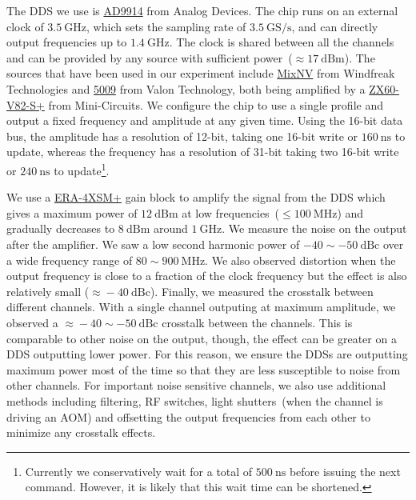 The DDS we use is \href{https://www.analog.com/en/products/ad9914.html}{AD9914}
from Analog Devices.
The chip runs on an external clock of $3.5~\mathrm{GHz}$,
which sets the sampling rate of $3.5~\mathrm{GS/s}$,
and can directly output frequencies up to $1.4~\mathrm{GHz}$.
The clock is shared between all the channels and can be provided by any source
with sufficient power~($\approx17~\mathrm{dBm}$).
The sources that have been used in our experiment include
\href{https://windfreaktech.com/product/rf-mixer-downconverter-upconverter/}{MixNV}
from Windfreak Technologies and
\href{https://www.valonrf.com/frequency-synthesizer-6ghz.html}{5009}
from Valon Technology, both being amplified by a
\href{https://www.minicircuits.com/WebStore/dashboard.html?model=ZX60-V82-S\%2B}{ZX60-V82-S+}
from Mini-Circuits.
We configure the chip to use a single profile
and output a fixed frequency and amplitude at any given time.
Using the 16-bit data bus,
the amplitude has a resolution of 12-bit, taking one 16-bit write or $160~\mathrm{ns}$ to update,
whereas the frequency has a resolution of 31-bit
taking two 16-bit write or $240~\mathrm{ns}$ to update\footnote{
  Currently we conservatively wait for a total of $500~\mathrm{ns}$
  before issuing the next command.
  However, it is likely that this wait time can be shortened.
}.

We use a \href{https://www.minicircuits.com/WebStore/dashboard.html?model=ERA-4XSM\%2B}{ERA-4XSM+}
gain block to amplify the signal from the DDS which gives a maximum power of $12~\mathrm{dBm}$
at low frequencies~($\leqslant\!100~\mathrm{MHz}$) and gradually decreases to $8~\mathrm{dBm}$
around $1~\mathrm{GHz}$.
We measure the noise on the output after the amplifier.
We saw a low second harmonic power of $-40\sim-50~\mathrm{dBc}$
over a wide frequency range of $80\sim900~\mathrm{MHz}$.
We also observed distortion when the output frequency is close to
a fraction of the clock frequency but the effect is also relatively small
($\approx\!-40~\mathrm{dBc}$).
Finally, we measured the crosstalk between different channels.
With a single channel outputing at maximum amplitude,
we observed a $\approx\!-40\sim-50~\mathrm{dBc}$ crosstalk between the channels.
This is comparable to other noise on the output, though,
the effect can be greater on a DDS outputting lower power.
For this reason, we ensure the DDSs are outputting maximum power most of the time
so that they are less susceptible to noise from other channels.
For important noise sensitive channels,
we also use additional methods including filtering, RF switches,
light shutters~(when the channel is driving an AOM)
and offsetting the output frequencies from each other to minimize any crosstalk effects.

